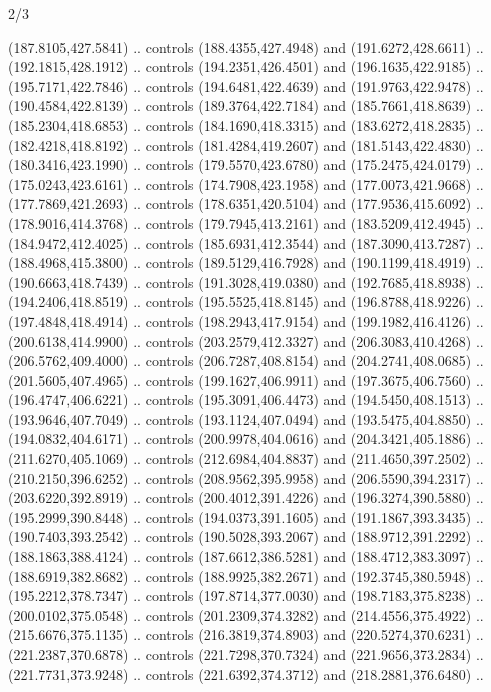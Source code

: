 \begin{flagdescription}{2/3}
\begin{scope}[shift={(0.5\flaglength,0.5)},scale=\flagwidth/545]
\begin{scope}[y=0.80pt, x=0.80pt, yscale=-1,shift={(-297,-430)}]
\begin{scope}[shift={(28.51887,-25.61095)}]
  (187.8105,427.5841) .. controls (188.4355,427.4948) and (191.6272,428.6611) ..
  (192.1815,428.1912) .. controls (194.2351,426.4501) and (196.1635,422.9185) ..
  (195.7171,422.7846) .. controls (194.6481,422.4639) and (191.9763,422.9478) ..
  (190.4584,422.8139) .. controls (189.3764,422.7184) and (185.7661,418.8639) ..
  (185.2304,418.6853) .. controls (184.1690,418.3315) and (183.6272,418.2835) ..
  (182.4218,418.8192) .. controls (181.4284,419.2607) and (181.5143,422.4830) ..
  (180.3416,423.1990) .. controls (179.5570,423.6780) and (175.2475,424.0179) ..
  (175.0243,423.6161) .. controls (174.7908,423.1958) and (177.0073,421.9668) ..
  (177.7869,421.2693) .. controls (178.6351,420.5104) and (177.9536,415.6092) ..
  (178.9016,414.3768) .. controls (179.7945,413.2161) and (183.5209,412.4945) ..
  (184.9472,412.4025) .. controls (185.6931,412.3544) and (187.3090,413.7287) ..
  (188.4968,415.3800) .. controls (189.5129,416.7928) and (190.1199,418.4919) ..
  (190.6663,418.7439) .. controls (191.3028,419.0380) and (192.7685,418.8938) ..
  (194.2406,418.8519) .. controls (195.5525,418.8145) and (196.8788,418.9226) ..
  (197.4848,418.4914) .. controls (198.2943,417.9154) and (199.1982,416.4126) ..
  (200.6138,414.9900) .. controls (203.2579,412.3327) and (206.3083,410.4268) ..
  (206.5762,409.4000) .. controls (206.7287,408.8154) and (204.2741,408.0685) ..
  (201.5605,407.4965) .. controls (199.1627,406.9911) and (197.3675,406.7560) ..
  (196.4747,406.6221) .. controls (195.3091,406.4473) and (194.5450,408.1513) ..
  (193.9646,407.7049) .. controls (193.1124,407.0494) and (193.5475,404.8850) ..
  (194.0832,404.6171) .. controls (200.9978,404.0616) and (204.3421,405.1886) ..
  (211.6270,405.1069) .. controls (212.6984,404.8837) and (211.4650,397.2502) ..
  (210.2150,396.6252) .. controls (208.9562,395.9958) and (206.5590,394.2317) ..
  (203.6220,392.8919) .. controls (200.4012,391.4226) and (196.3274,390.5880) ..
  (195.2999,390.8448) .. controls (194.0373,391.1605) and (191.1867,393.3435) ..
  (190.7403,393.2542) .. controls (190.5028,393.2067) and (188.9712,391.2292) ..
  (188.1863,388.4124) .. controls (187.6612,386.5281) and (188.4712,383.3097) ..
  (188.6919,382.8682) .. controls (188.9925,382.2671) and (192.3745,380.5948) ..
  (195.2212,378.7347) .. controls (197.8714,377.0030) and (198.7183,375.8238) ..
  (200.0102,375.0548) .. controls (201.2309,374.3282) and (214.4556,375.4922) ..
  (215.6676,375.1135) .. controls (216.3819,374.8903) and (220.5274,370.6231) ..
  (221.2387,370.6878) .. controls (221.7298,370.7324) and (221.9656,373.2834) ..
  (221.7731,373.9248) .. controls (221.6392,374.3712) and (218.2881,376.6480) ..

\end{scope}
\end{scope}
\end{scope}
\end{flagdescription}
